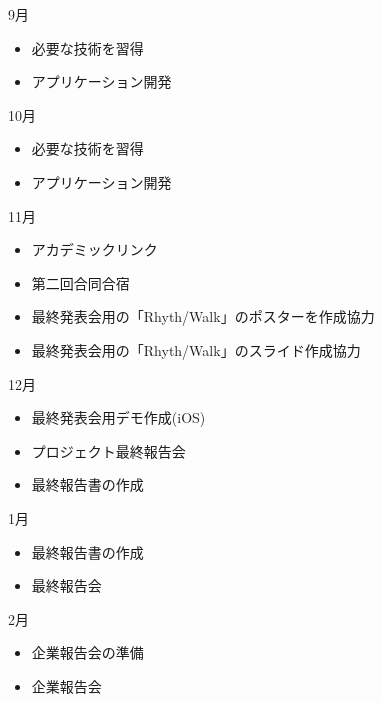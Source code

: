 9月 
\begin{itemize}
\item 必要な技術を習得
\item アプリケーション開発
\end{itemize}
10月
\begin{itemize}
\item 必要な技術を習得
\item アプリケーション開発
\end{itemize}
11月
\begin{itemize}
\item アカデミックリンク
\item 第二回合同合宿
\item 最終発表会用の「Rhyth/Walk」のポスターを作成協力
\item 最終発表会用の「Rhyth/Walk」のスライド作成協力
\end{itemize}
12月
\begin{itemize}
\item 最終発表会用デモ作成(iOS)
\item プロジェクト最終報告会
\item 最終報告書の作成
\end{itemize}
1月
\begin{itemize}
\item 最終報告書の作成
\item 最終報告会
\end{itemize}
2月
\begin{itemize}
\item 企業報告会の準備
\item 企業報告会
\end{itemize}


